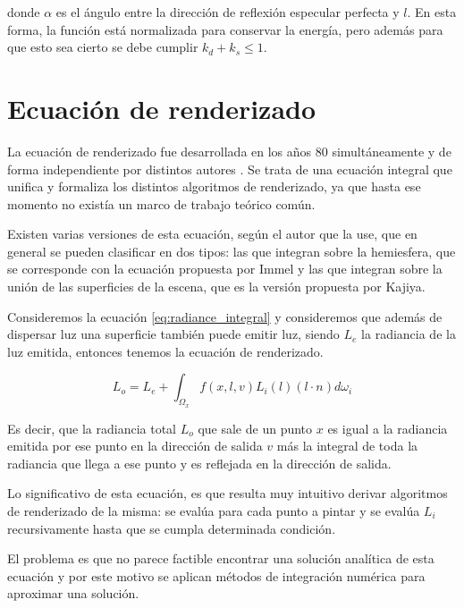 donde $\alpha$ es el ángulo entre la dirección de reflexión especular perfecta y $l$.
En esta forma, la función está normalizada para conservar la energía, pero además para que esto sea cierto se debe cumplir $k_d + k_s \leq 1$.



\clearpage

\section{Ecuación de renderizado}

La ecuación de renderizado fue desarrollada en los años 80 simultáneamente y de forma independiente por distintos autores \cite{Kajiya1986, Immel1986}. Se trata de una ecuación integral que unifica y formaliza los distintos algoritmos de renderizado, ya que hasta ese momento no existía un marco de trabajo teórico común.

\medskip
Existen varias versiones de esta ecuación, según el autor que la use, que en general se pueden clasificar en dos tipos: las que integran sobre la hemiesfera, que se corresponde con la ecuación propuesta por Immel y las que integran sobre la unión de las superficies de la escena, que es la versión propuesta por Kajiya.
\medskip

Consideremos la ecuación \ref{eq:radiance_integral}  y consideremos que además de dispersar luz una superficie también puede emitir luz, siendo $L_e$ la radiancia de la luz emitida, entonces tenemos la ecuación de renderizado.

\begin{equation}
L _ o = L_e + \int_{\Omega_x} f(x, l, v) L_i(l) (l \cdot n) d\omega_i 
\end{equation}

Es decir, que la radiancia total $L_o$ que sale de un punto $x$ es igual a la radiancia emitida por ese punto en la dirección de salida $v$ más la integral de toda la radiancia que llega a ese punto y es reflejada en la dirección de salida.
\medskip

Lo significativo de esta ecuación, es que resulta muy intuitivo derivar algoritmos de renderizado de la misma: se evalúa para cada punto a pintar y se evalúa $L_i$ recursivamente hasta que se cumpla determinada condición.
\medskip

El problema es que no parece factible encontrar una solución analítica de esta ecuación y por este motivo se aplican métodos de integración numérica para aproximar una solución.

